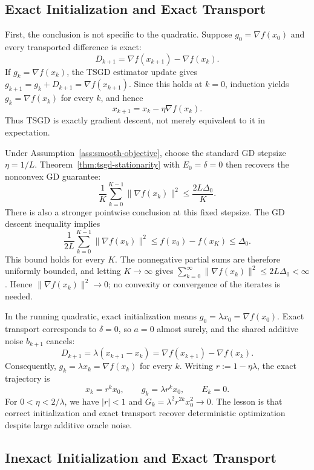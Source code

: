 \subsection{Exact Initialization and Exact Transport}
\label{subsec:exact-init-exact-transport}

First, the conclusion is not specific to the quadratic. Suppose
$g_0=\nabla f(x_0)$ and every transported difference is exact:
\[
D_{k+1}=\nabla f(x_{k+1})-\nabla f(x_k).
\]
If $g_k=\nabla f(x_k)$, the TSGD estimator update gives
$g_{k+1}=g_k+D_{k+1}=\nabla f(x_{k+1})$. Since this holds at
$k=0$, induction yields $g_k=\nabla f(x_k)$ for every $k$, and hence
\[
x_{k+1}=x_k-\eta\nabla f(x_k).
\]
Thus TSGD is exactly gradient descent, not merely equivalent to it
in expectation.

Under Assumption~\ref{ass:smooth-objective}, choose the standard GD
stepsize $\eta=1/L$. Theorem~\ref{thm:tsgd-stationarity} with
$E_0=\delta=0$ then recovers the nonconvex GD guarantee:
\begin{equation}
\label{eq:exact-transport-gd-bound}
\frac{1}{K}\sum_{k=0}^{K-1}\|\nabla f(x_k)\|^2
\leq\frac{2L\Delta_0}{K}.
\end{equation}
There is also a stronger pointwise conclusion at this fixed
stepsize. The GD descent inequality implies
\[
\frac{1}{2L}\sum_{k=0}^{K-1}\|\nabla f(x_k)\|^2
\leq f(x_0)-f(x_K)\leq\Delta_0.
\]
This bound holds for every $K$. The nonnegative partial sums are
therefore uniformly bounded, and letting $K\to\infty$ gives
$\sum_{k=0}^{\infty}\|\nabla f(x_k)\|^2\leq2L\Delta_0<\infty$.
Hence $\|\nabla f(x_k)\|^2\to0$; no convexity or convergence of the
iterates is needed.

In the running quadratic, exact initialization means
$g_0=\lambda x_0=\nabla f(x_0)$. Exact transport corresponds to
$\delta=0$, so $a=0$ almost surely, and the shared additive noise
$b_{k+1}$ cancels:
\[
D_{k+1}=\lambda(x_{k+1}-x_k)
=\nabla f(x_{k+1})-\nabla f(x_k).
\]
Consequently, $g_k=\lambda x_k=\nabla f(x_k)$ for every $k$.
Writing $r:=1-\eta\lambda$, the exact trajectory is
\begin{equation}
\label{eq:quadratic-exact-gd}
x_k=r^k x_0,\qquad
g_k=\lambda r^k x_0,\qquad E_k=0.
\end{equation}
For $0<\eta<2/\lambda$, we have $|r|<1$ and
$G_k=\lambda^2r^{2k}x_0^2\to0$.
The lesson is that correct initialization and exact transport recover
deterministic optimization despite large additive oracle noise.

\subsection{Inexact Initialization and Exact Transport}
\label{subsec:inexact-init-exact-transport}

